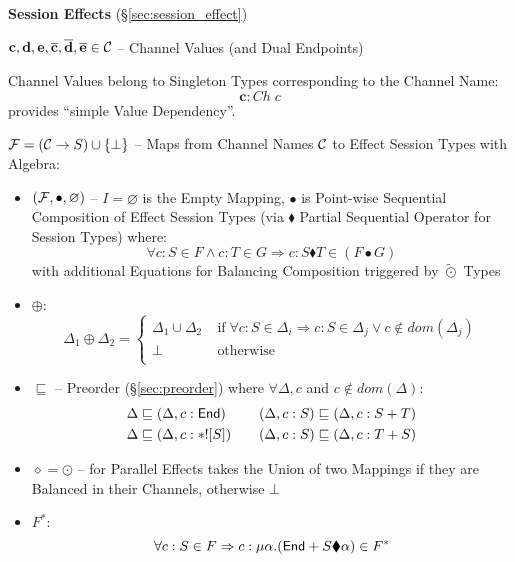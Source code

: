 \textbf{Session Effects} (\S\ref{sec:session_effect})

$\mathbf{c,d,e,\overline{c},\overline{d},\overline{e}}
\in \mathcal{C}$ -- Channel Values (and Dual Endpoints)

Channel Values belong to Singleton Types corresponding to the Channel
Name:
\[
  \mathbf{c} : Ch\;c
\]
provides ``simple Value Dependency''. %

$\mathcal{F} = (\mathcal{C} \rightarrow S) \cup \{\bot\}$ -- Maps from
Channel Names $\mathcal{C}$ to Effect Session Types with Algebra:
\begin{itemize}
  \item $(\mathcal{F},\bullet,\varnothing)$ -- $I = \varnothing$ is the
    Empty Mapping, $\bullet$ is Point-wise Sequential Composition of
    Effect Session Types (via $\blacklozenge$ Partial Sequential
    Operator for Session Types) where:
    \[
      \forall c:S \in F \wedge c:T \in G
        \Rightarrow c:S \blacklozenge T \in (F \bullet G)
    \]
    with additional Equations for Balancing Composition triggered by
    $\tilde{\odot}$ Types %
  \item $\oplus$:
    \[
      \Delta_1 \oplus \Delta_2 =
      \begin{cases}
        \Delta_1 \cup \Delta_2 & \;\text{if}\;
          \forall c:S \in \Delta_i
          \Rightarrow c:S \in \Delta_j \vee c \notin dom(\Delta_j) \\
        \bot & \;\text{otherwise} \\
      \end{cases}
    \]
  \item $\sqsubseteq$ -- Preorder (\S\ref{sec:preorder}) where
    $\forall\Delta,c$ and $c \notin dom(\Delta)$:
    \[\begin{aligned}
        \Delta &\sqsubseteq (\Delta,c:\mathsf{End}) \\
        \Delta &\sqsubseteq (\Delta,c:*![S]) \\
      \end{aligned}
      \quad\quad
      \begin{aligned}
        (\Delta,c:S) &\sqsubseteq (\Delta,c:S + T) \\
        (\Delta,c:S) &\sqsubseteq (\Delta,c:T + S) \\
    \end{aligned}\]
  \item $\diamond = \odot$ -- for Parallel Effects takes the Union of
    two Mappings if they are Balanced in their Channels, otherwise
    $\bot$ %
  \item $F^*$:
    \[
      \forall c:S \in F
        \Rightarrow c:\mu\alpha.(\mathsf{End} + S \blacklozenge \alpha) \in F^*
    \]
\end{itemize}

